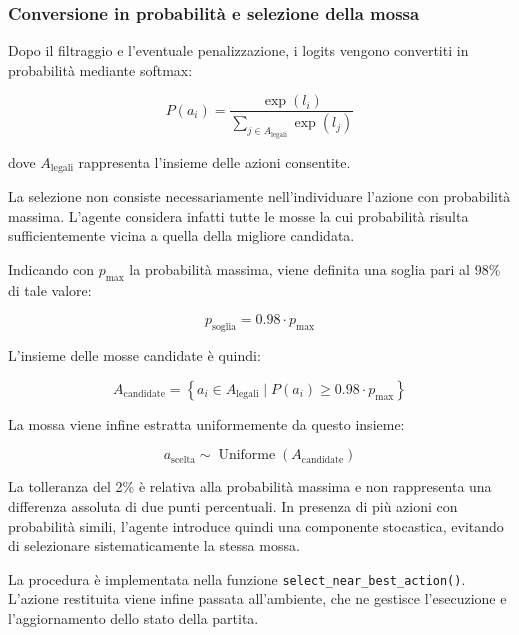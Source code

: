 \subsubsection{Conversione in probabilità e selezione della mossa}

Dopo il filtraggio e l'eventuale penalizzazione, i logits vengono convertiti in probabilità mediante softmax:

\[
    P(a_i) =
    \frac{\exp(l_i)}
    {\sum_{j \in A_{\mathrm{legali}}}\exp(l_j)}
\]

dove \(A_{\mathrm{legali}}\) rappresenta l'insieme delle azioni consentite.

La selezione non consiste necessariamente nell'individuare l'azione con probabilità massima. L'agente considera infatti tutte le mosse la cui probabilità risulta sufficientemente vicina a quella della migliore candidata.

Indicando con \(p_{\max}\) la probabilità massima, viene definita una soglia pari al 98\% di tale valore:

\[
    p_{\mathrm{soglia}}=0.98\cdot p_{\max}
\]

L'insieme delle mosse candidate è quindi:

\[
    A_{\mathrm{candidate}} =
    \left\{
    a_i \in A_{\mathrm{legali}}
    \mid P(a_i)\geq 0.98\cdot p_{\max}
    \right\}
\]

La mossa viene infine estratta uniformemente da questo insieme:

\[
    a_{\mathrm{scelta}}\sim
    \operatorname{Uniforme}(A_{\mathrm{candidate}})
\]

La tolleranza del 2\% è relativa alla probabilità massima e non rappresenta una differenza assoluta di due punti percentuali. In presenza di più azioni con probabilità simili, l'agente introduce quindi una componente stocastica, evitando di selezionare sistematicamente la stessa mossa.

La procedura è implementata nella funzione \texttt{select\_near\_best\_action()}. L'azione restituita viene infine passata all'ambiente, che ne gestisce l'esecuzione e l'aggiornamento dello stato della partita.
